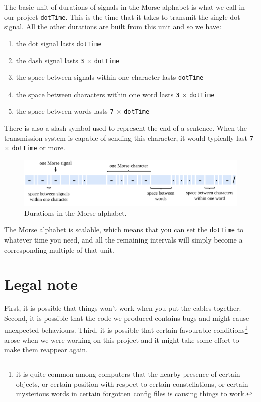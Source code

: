 \documentclass[12pt]{report}
\begin{document}
The basic unit of durations of signals in the Morse alphabet is what we call in our project \verb|dotTime|. This is the time that it takes to transmit the single dot signal. All the other durations are built from this unit and so we have:

\begin{enumerate}
\item the dot signal lasts \verb|dotTime|

\item the dash signal lasts \verb|3| $\times$ \verb|dotTime|

\item the space between signals within one character lasts \verb|dotTime|

\item the space between characters within one word lasts \verb|3| $\times$ \verb|dotTime|

\item the space between words lasts \verb|7| $\times$ \verb|dotTime|

\end{enumerate}

There is also a slash symbol used to represent the end of a sentence. When the transmission system is capable of sending this character, it would typically last \verb|7| $\times$ \verb|dotTime| or more.

\begin{figure}[H]
\centering\includegraphics[width=14.5cm]{morse_durations}
\caption{Durations in the Morse alphabet.}			
\label{fig:morse_durations}
\end{figure}

The Morse alphabet is scalable, which means that you can set the \verb|dotTime| to whatever time you need, and all the remaining intervals will simply become a corresponding multiple of that unit.

\section{Legal note}

First, it is possible that things won't work when you put the cables together. Second, it is possible that the code we produced contains bugs and might cause unexpected behaviours. Third, it is possible that certain favourable conditions\footnote{it is quite common among computers that the nearby presence of certain objects, or certain position with respect to certain constellations, or certain mysterious words in certain forgotten config files is causing things to work.} arose when we were working on this project and it might take some effort to make them reappear again.
\end{document}
